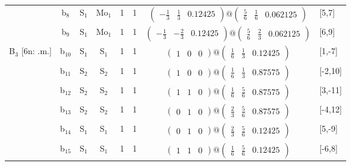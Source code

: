 \documentclass[fleqn,10pt,landscape]{article}
\begin{document}
\begin{itemize}
\begin{center}
\begin{longtable}{cc|cc|c|c|c|l}
& b$_{8}$ & S$_{1}$ & Mo$_{1}$ & 1 & 1 & $\begin{pmatrix} - \frac{1}{3} & \frac{1}{3} & 0.12425 \end{pmatrix}@\begin{pmatrix} \frac{5}{6} & \frac{1}{6} & 0.062125 \end{pmatrix}$ & [5,7] \\
& b$_{9}$ & S$_{1}$ & Mo$_{1}$ & 1 & 1 & $\begin{pmatrix} - \frac{1}{3} & - \frac{2}{3} & 0.12425 \end{pmatrix}@\begin{pmatrix} \frac{5}{6} & \frac{2}{3} & 0.062125 \end{pmatrix}$ & [6,9] \\ \hline
B$_{3}$ [6n: .m.] & b$_{10}$ & S$_{1}$ & S$_{1}$ & 1 & 1 & $\begin{pmatrix} 1 & 0 & 0 \end{pmatrix}@\begin{pmatrix} \frac{1}{6} & \frac{1}{3} & 0.12425 \end{pmatrix}$ & [1,-7] \\
& b$_{11}$ & S$_{2}$ & S$_{2}$ & 1 & 1 & $\begin{pmatrix} 1 & 0 & 0 \end{pmatrix}@\begin{pmatrix} \frac{1}{6} & \frac{1}{3} & 0.87575 \end{pmatrix}$ & [-2,10] \\
& b$_{12}$ & S$_{2}$ & S$_{2}$ & 1 & 1 & $\begin{pmatrix} 1 & 1 & 0 \end{pmatrix}@\begin{pmatrix} \frac{1}{6} & \frac{5}{6} & 0.87575 \end{pmatrix}$ & [3,-11] \\
& b$_{13}$ & S$_{2}$ & S$_{2}$ & 1 & 1 & $\begin{pmatrix} 0 & 1 & 0 \end{pmatrix}@\begin{pmatrix} \frac{2}{3} & \frac{5}{6} & 0.87575 \end{pmatrix}$ & [-4,12] \\
& b$_{14}$ & S$_{1}$ & S$_{1}$ & 1 & 1 & $\begin{pmatrix} 0 & 1 & 0 \end{pmatrix}@\begin{pmatrix} \frac{2}{3} & \frac{5}{6} & 0.12425 \end{pmatrix}$ & [5,-9] \\
& b$_{15}$ & S$_{1}$ & S$_{1}$ & 1 & 1 & $\begin{pmatrix} 1 & 1 & 0 \end{pmatrix}@\begin{pmatrix} \frac{1}{6} & \frac{5}{6} & 0.12425 \end{pmatrix}$ & [-6,8] \\
\end{longtable}
\end{center}


\end{itemize}
\end{document}

